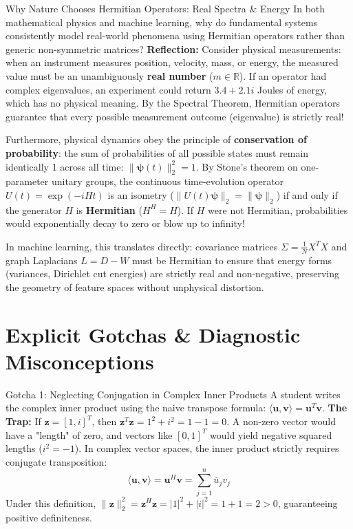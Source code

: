 \begin{ponderbox}{Why Nature Chooses Hermitian Operators: Real Spectra \& Energy}
In both mathematical physics and machine learning, why do fundamental systems consistently model real-world phenomena using Hermitian operators rather than generic non-symmetric matrices?
\tcblower
\textbf{Reflection:}
Consider physical measurements: when an instrument measures position, velocity, mass, or energy, the measured value must be an unambiguously \textbf{real number} ($m \in \mathbb{R}$). If an operator had complex eigenvalues, an experiment could return $3.4 + 2.1i$ Joules of energy, which has no physical meaning. By the Spectral Theorem, Hermitian operators guarantee that every possible measurement outcome (eigenvalue) is strictly real!

Furthermore, physical dynamics obey the principle of \textbf{conservation of probability}: the sum of probabilities of all possible states must remain identically 1 across all time: $\|\boldsymbol{\psi}(t)\|_2^2 = 1$.
By Stone's theorem on one-parameter unitary groups, the continuous time-evolution operator $U(t) = \exp(-i H t)$ is an isometry ($\|U(t)\boldsymbol{\psi}\|_2 = \|\boldsymbol{\psi}\|_2$) if and only if the generator $H$ is \textbf{Hermitian} ($H^H = H$).
If $H$ were not Hermitian, probabilities would exponentially decay to zero or blow up to infinity!

In machine learning, this translates directly: covariance matrices $\Sigma = \frac{1}{N} X^T X$ and graph Laplacians $L = D - W$ must be Hermitian to ensure that energy forms (variances, Dirichlet cut energies) are strictly real and non-negative, preserving the geometry of feature spaces without unphysical distortion.
\end{ponderbox}

\section{Explicit Gotchas \& Diagnostic Misconceptions}

\begin{trapbox}{Gotcha 1: Neglecting Conjugation in Complex Inner Products}
A student writes the complex inner product using the naive transpose formula: $\langle \mathbf{u}, \mathbf{v} \rangle = \mathbf{u}^T \mathbf{v}$.
\textbf{The Trap:} If $\mathbf{z} = [1, i]^T$, then $\mathbf{z}^T \mathbf{z} = 1^2 + i^2 = 1 - 1 = 0$. A non-zero vector would have a "length" of zero, and vectors like $[0, 1]^T$ would yield negative squared lengths ($i^2 = -1$). In complex vector spaces, the inner product strictly requires conjugate transposition:
\begin{equation*}
\langle \mathbf{u}, \mathbf{v} \rangle = \mathbf{u}^H \mathbf{v} = \sum_{j=1}^n \bar{u}_j v_j
\end{equation*}
Under this definition, $\|\mathbf{z}\|_2^2 = \mathbf{z}^H \mathbf{z} = |1|^2 + |i|^2 = 1 + 1 = 2 > 0$, guaranteeing positive definiteness.
\end{trapbox}

